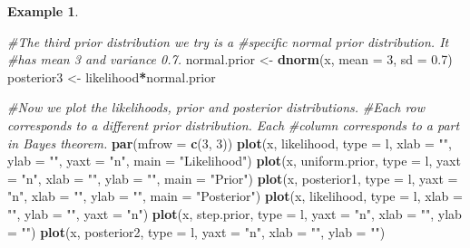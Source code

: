\documentclass[
]{book}
\newenvironment{Shaded}{\begin{snugshade}}{\end{snugshade}}
\newcommand{\AttributeTok}[1]{\textcolor[rgb]{0.13,0.29,0.53}{#1}}
\newcommand{\CommentTok}[1]{\textcolor[rgb]{0.56,0.35,0.01}{\textit{#1}}}
\newcommand{\DecValTok}[1]{\textcolor[rgb]{0.00,0.00,0.81}{#1}}
\newcommand{\FloatTok}[1]{\textcolor[rgb]{0.00,0.00,0.81}{#1}}
\newcommand{\FunctionTok}[1]{\textcolor[rgb]{0.13,0.29,0.53}{\textbf{#1}}}
\newcommand{\NormalTok}[1]{#1}
\newcommand{\OtherTok}[1]{\textcolor[rgb]{0.56,0.35,0.01}{#1}}
\newcommand{\SpecialCharTok}[1]{\textcolor[rgb]{0.81,0.36,0.00}{\textbf{#1}}}
\newcommand{\StringTok}[1]{\textcolor[rgb]{0.31,0.60,0.02}{#1}}
\theoremstyle{definition}
\theoremstyle{definition}
\newtheorem{example}{Example}[chapter]
\theoremstyle{definition}
\theoremstyle{definition}
\theoremstyle{remark}
\begin{document}
\begin{example}
\begin{Shaded}
\begin{Highlighting}[]
\CommentTok{\#The third prior distribution we try is a}
\CommentTok{\#specific normal prior distribution. It}
\CommentTok{\#has mean 3 and variance 0.7.}
\NormalTok{normal.prior }\OtherTok{\textless{}{-}} \FunctionTok{dnorm}\NormalTok{(x, }\AttributeTok{mean =} \DecValTok{3}\NormalTok{, }\AttributeTok{sd =} \FloatTok{0.7}\NormalTok{)}
\NormalTok{posterior3 }\OtherTok{\textless{}{-}}\NormalTok{ likelihood}\SpecialCharTok{*}\NormalTok{normal.prior}

\CommentTok{\#Now we plot the likelihoods, prior and posterior distributions. }
\CommentTok{\#Each row corresponds to a different prior distribution. Each}
\CommentTok{\#column corresponds to a part in Bayes\textquotesingle{} theorem. }
\FunctionTok{par}\NormalTok{(}\AttributeTok{mfrow =} \FunctionTok{c}\NormalTok{(}\DecValTok{3}\NormalTok{, }\DecValTok{3}\NormalTok{))}
\FunctionTok{plot}\NormalTok{(x, likelihood, }\AttributeTok{type =} \StringTok{\textquotesingle{}l\textquotesingle{}}\NormalTok{, }\AttributeTok{xlab =} \StringTok{""}\NormalTok{, }\AttributeTok{ylab =} \StringTok{""}\NormalTok{, }\AttributeTok{yaxt =} \StringTok{"n"}\NormalTok{, }\AttributeTok{main =} \StringTok{"Likelihood"}\NormalTok{)}
\FunctionTok{plot}\NormalTok{(x, uniform.prior, }\AttributeTok{type =} \StringTok{\textquotesingle{}l\textquotesingle{}}\NormalTok{, }\AttributeTok{yaxt =} \StringTok{"n"}\NormalTok{, }\AttributeTok{xlab =} \StringTok{""}\NormalTok{, }\AttributeTok{ylab =} \StringTok{""}\NormalTok{, }\AttributeTok{main =} \StringTok{"Prior"}\NormalTok{)}
\FunctionTok{plot}\NormalTok{(x, posterior1, }\AttributeTok{type =} \StringTok{\textquotesingle{}l\textquotesingle{}}\NormalTok{, }\AttributeTok{yaxt =} \StringTok{"n"}\NormalTok{, }\AttributeTok{xlab =} \StringTok{""}\NormalTok{, }\AttributeTok{ylab =} \StringTok{""}\NormalTok{, }\AttributeTok{main =} \StringTok{"Posterior"}\NormalTok{)}
\FunctionTok{plot}\NormalTok{(x, likelihood, }\AttributeTok{type =} \StringTok{\textquotesingle{}l\textquotesingle{}}\NormalTok{, }\AttributeTok{xlab =} \StringTok{""}\NormalTok{, }\AttributeTok{ylab =} \StringTok{""}\NormalTok{, }\AttributeTok{yaxt =} \StringTok{"n"}\NormalTok{)}
\FunctionTok{plot}\NormalTok{(x, step.prior, }\AttributeTok{type =} \StringTok{\textquotesingle{}l\textquotesingle{}}\NormalTok{, }\AttributeTok{yaxt =} \StringTok{"n"}\NormalTok{, }\AttributeTok{xlab =} \StringTok{""}\NormalTok{, }\AttributeTok{ylab =} \StringTok{""}\NormalTok{)}
\FunctionTok{plot}\NormalTok{(x, posterior2, }\AttributeTok{type =} \StringTok{\textquotesingle{}l\textquotesingle{}}\NormalTok{, }\AttributeTok{yaxt =} \StringTok{"n"}\NormalTok{, }\AttributeTok{xlab =} \StringTok{""}\NormalTok{, }\AttributeTok{ylab =} \StringTok{""}\NormalTok{)}

\end{Highlighting}
\end{Shaded}
\end{example}
\end{document}
